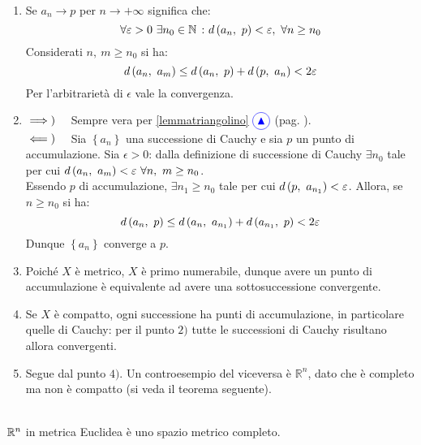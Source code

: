 \begin{demonstration}~{}
	\begin{enumerate}[label=\Roman*]
		\item Se $a_n\to p$ per $n\to +\infty$ significa che:
		\begin{equation*}
			\forall \epsilon>0\ \exists n_0\in\naturalset\ \colon \mvf{d}{a_n}{p}<\epsilon,\ \forall n\geq n_0
		\end{equation*}
	Considerati $n,\ m\geq n_0$ si ha:
	\begin{equation}
		d\left(a_n,\ a_m\right)\leq d\left(a_n,\ p\right)+d\left(p,\ a_n\right)< 2\varepsilon
	\end{equation}
Per l'arbitrarietà di $\epsilon$ vale la convergenza.
\item $\implies)\quad$ Sempre vera per \ref{lemmatriangolino} $\textcolor{blue}{\circled{{\large \blacktriangle}}}$ (pag. \pageref{lemmatriangolino}).\\
$\impliedby)\quad$ Sia $\left\{a_n\right\}$ una successione di Cauchy e sia $p$ un punto di accumulazione. Sia $\epsilon>0$: dalla definizione di successione di Cauchy $\exists n_0$ tale per cui $\mvf{d}{a_n}{a_m}<\epsilon\ \forall n,\ m\geq n_0$.\\
Essendo $p$ di accumulazione, $\exists n_1\geq n_0$ tale per cui $d\left(p,\ a_{n_1}\right)<\varepsilon$. Allora, se $n\geq n_0$ si ha:
	\begin{equation*}
	d\left(a_n,\ p\right)\leq d\left(a_n,\ a_{n_1}\right)+d\left(a_{n_1},\ p\right)< 2\varepsilon
\end{equation*}
Dunque $\left\{a_n\right\}$ converge a $p$.
\item Poiché $X$ è metrico, $X$ è primo numerabile, dunque avere un punto di accumulazione è equivalente ad avere una sottosuccessione convergente.
\item Se $X$ è compatto, ogni successione ha punti di accumulazione, in particolare quelle di Cauchy: per il punto $2)$ tutte le successioni di Cauchy risultano allora convergenti.
\item Segue dal punto $4)$. Un controesempio del viceversa è $\mathbb{R}^n$, dato che è completo ma non è compatto (si veda il teorema seguente).
\end{enumerate}
\vspace{-3mm}
\end{demonstration}
\begin{theorema}~{}\\
	$\mathbb{R}^n$ in metrica Euclidea è uno spazio metrico completo.
\end{theorema}
